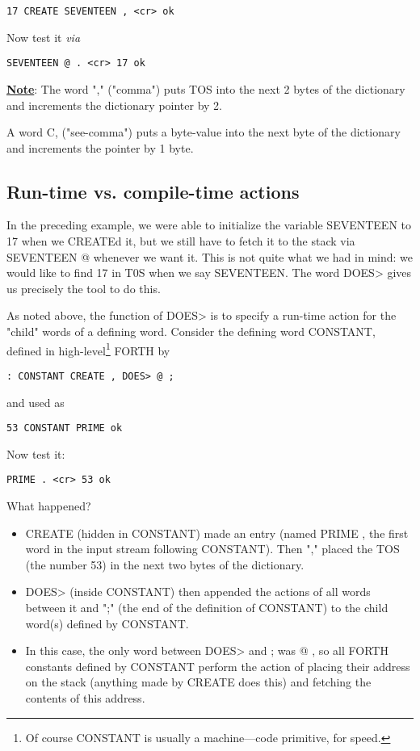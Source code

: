 \begin{lstlisting}
17 CREATE SEVENTEEN , <cr> ok
\end{lstlisting}

Now test it \textit{via}

\begin{lstlisting}
SEVENTEEN @ . <cr> 17 ok
\end{lstlisting}

\underline{\textbf{Note}}: The word "," ("comma") puts TOS into the next 2 bytes of the dictionary and increments the dictionary pointer by 2.

A word C, ("see-comma") puts a byte-value into the next byte of the dictionary and increments the pointer by 1 byte.

\subsection{Run-time vs. compile-time actions}

In the preceding example, we were able to initialize the variable SEVENTEEN to 17 when we CREATEd it, but we still have to fetch it to the stack via SEVENTEEN @ whenever we want it. This is not quite what we had in mind: we would like to find 17 in T0S when we say SEVENTEEN. The word DOES> gives us precisely the tool to do this.

As noted above, the function of DOES> is to specify a run-time action for the "child" words of a defining word. Consider the defining word CONSTANT, defined in high-level\footnote{Of course CONSTANT is usually a machine—code primitive, for speed.} FORTH by

\begin{lstlisting}
: CONSTANT CREATE , DOES> @ ;
\end{lstlisting}
and used as
\begin{lstlisting}
53 CONSTANT PRIME ok
\end{lstlisting}

Now test it:
\begin{lstlisting}
PRIME . <cr> 53 ok
\end{lstlisting}

What happened?
\begin{itemize}
    \item CREATE (hidden in CONSTANT) made an entry (named PRIME , the first word in the input stream following CONSTANT). Then "," placed the TOS (the number 53) in the next two bytes of the dictionary.
    \item DOES> (inside CONSTANT) then appended the actions of all words between it and ";" (the end of the definition of CONSTANT) to the child word(s) defined by CONSTANT.
    \item In this case, the only word between DOES> and ; was @ , so all FORTH constants defined by CONSTANT perform the action of placing their address on the stack (anything made by CREATE does this) and fetching the contents of this address.
\end{itemize}

